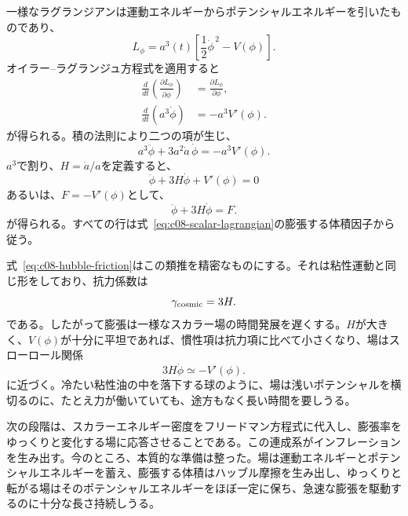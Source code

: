 一様なラグランジアンは運動エネルギーからポテンシャルエネルギーを引いたものであり、
\begin{equation}
L_\phi=a^3(t)
\left[
\frac12\dot\phi^{\,2}-V(\phi)
\right].
\label{eq:c08-scalar-lagrangian}
\end{equation}
オイラー--ラグランジュ方程式を適用すると
\begin{align}
\frac{d}{dt}\left(\frac{\partial L_\phi}{\partial\dot\phi}\right)
&=
\frac{\partial L_\phi}{\partial\phi},\\
\frac{d}{dt}\left(a^3\dot\phi\right)
&=-a^3V'(\phi).
\end{align}
が得られる。積の法則により二つの項が生じ、
\begin{equation}
a^3\ddot\phi+3a^2\dot a\,\dot\phi
=-a^3V'(\phi).
\end{equation}
\(a^3\)で割り、\(H=\dot a/a\)を定義すると、
\begin{equation}
\boxed{
\ddot\phi+3H\dot\phi+V'(\phi)=0
}
\label{eq:c08-hubble-friction}
\end{equation}
あるいは、\(F=-V'(\phi)\)として、
\begin{equation}
\ddot\phi+3H\dot\phi=F.
\end{equation}
が得られる。すべての行は式~\eqref{eq:c08-scalar-lagrangian}の膨張する体積因子から従う。

\begin{classroomqa}
\end{classroomqa}

式~\eqref{eq:c08-hubble-friction}はこの類推を精密なものにする。それは粘性運動と同じ形をしており、抗力係数は
\begin{equation}
\gamma_{\rm cosmic}=3H.
\end{equation}
である。したがって膨張は一様なスカラー場の時間発展を遅くする。\(H\)が大きく、\(V(\phi)\)が十分に平坦であれば、慣性項は抗力項に比べて小さくなり、場はスローロール関係
\begin{equation}
3H\dot\phi\simeq-V'(\phi).
\end{equation}
に近づく。冷たい粘性油の中を落下する球のように、場は浅いポテンシャルを横切るのに、たとえ力が働いていても、途方もなく長い時間を要しうる。

次の段階は、スカラーエネルギー密度をフリードマン方程式に代入し、膨張率をゆっくりと変化する場に応答させることである。この連成系がインフレーションを生み出す。今のところ、本質的な準備は整った。場は運動エネルギーとポテンシャルエネルギーを蓄え、膨張する体積はハッブル摩擦を生み出し、ゆっくりと転がる場はそのポテンシャルエネルギーをほぼ一定に保ち、急速な膨張を駆動するのに十分な長さ持続しうる。

